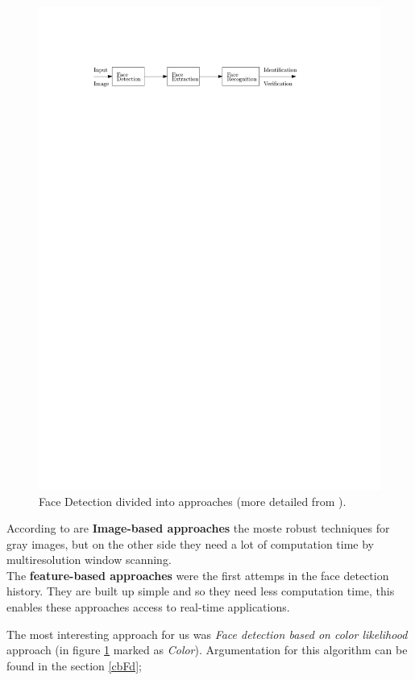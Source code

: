 \documentclass[Bachelorarbeit.tex]{subfiles}
\begin{document}
\begin{figure}[!h] %
\centering
\includegraphics[page=3, width=14cm]{./pictures/drawings_2}
\caption{Face Detection divided into approaches (more detailed from \cite{FDASurvey}). \label{FDaS}}
\end{figure}

According to \cite{FDASurvey} are \textbf{Image-based approaches} the moste robust techniques for gray images, but on the other side they need a lot of computation time by multiresolution window scanning.\\
The \textbf{feature-based approaches} were the first attemps in the face detection history. They are built up simple and so they need less computation time, this enables these approaches access to real-time applications.

The most interesting approach for us was \textit{Face detection based on color likelihood} approach (in figure \ref{FDaS} marked as \textit{Color}). Argumentation for this algorithm can be found in the section \ref{cbFd};
\end{document}
